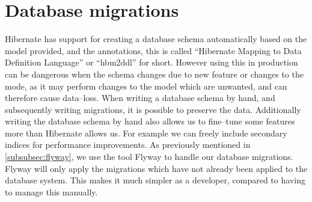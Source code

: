 \section{Database migrations}
Hibernate has support for creating a database schema automatically based on the model provided, and the annotations,
this is called ``Hibernate Mapping to Data Definition Language'' or ``hbm2ddl'' for short.
However using this in production can be dangerous when the schema changes due to new feature or changes to the mode,
as it may perform changes to the model which are unwanted,
and can therefore cause data--loss\cite[p.~64]{javapersistence}.
When writing a database schema by hand, and subsequently writing migrations, it is possible to preserve the data.
Additionally writing the database schema by hand also allows us to fine--tune some features more than Hibernate allows us.
For example we can freely include secondary indices for performance improvements.
As previously mentioned in \cref{subsubsec:flyway}, we use the tool Flyway to handle our database migrations.
Flyway will only apply the migrations which have not already been applied to the database system.
This makes it much simpler as a developer, compared to having to manage this manually.

